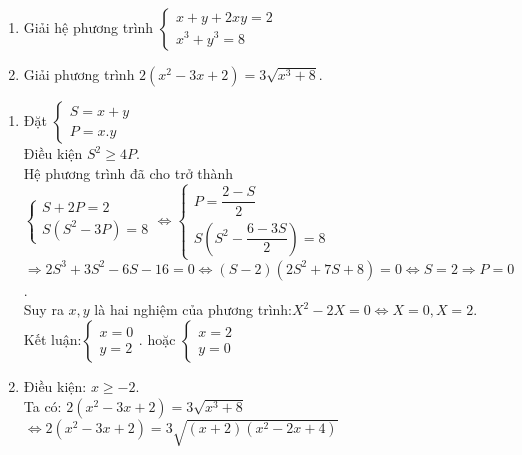 \begin{ex}%
 \hfill
 \begin{enumerate}
         \item Giải hệ phương trình $\left\{ \begin{array}{l}
x + y + 2xy = 2\\
x^3 + y^3 = 8
\end{array} \right.$
        \item Giải phương trình
$2(x^2 - 3x + 2) = 3\sqrt {x^3 + 8}$.
    \end{enumerate}
\loigiai
    {
    \begin{enumerate}
        \item Đặt
        $\left\{ \begin{array}{l}
        S = x + y\\
        P = x.y
                    \end{array} \right.$\\
        Điều kiện $S^2 \ge 4P$.\\
        Hệ phương trình đã cho trở thành
        $\left\{ \begin{array}{l}
S + 2P = 2\\
S\left( {S^2 - 3P} \right) = 8
\end{array} \right. \Leftrightarrow \left\{ \begin{array}{l}
P = \dfrac{{2 - S}}{2}\\
S\left( {S^2 - \dfrac{6 - 3S}{2}} \right) = 8
\end{array} \right.$\\
$ \Rightarrow 2S^3 + 3S^2 - 6S - 16 = 0 \Leftrightarrow \left( S - 2 \right)\left( {2S^2 + 7S + 8} \right) = 0 \Leftrightarrow S = 2 \Rightarrow P = 0$. \\
Suy ra $x,y$ là hai nghiệm của phương trình:$X^2 - 2X = 0 \Leftrightarrow X = 0,X = 2$.\\
Kết luận:$\left\{ \begin{array}{l}
x = 0\\
y = 2
\end{array} \right.$.
 hoặc
 $\left\{ \begin{array}{l}
x = 2\\
y = 0
\end{array} \right.$
        \item Điều kiện: $x\geq -2$.\\
Ta có: $2(x^2 - 3x + 2) = 3\sqrt {x^3 + 8} $\\
$\Leftrightarrow 2(x^2 - 3x + 2) = 3\sqrt {(x + 2)(x^2 - 2x + 4)} $\\

\end{enumerate}}
\end{ex}
